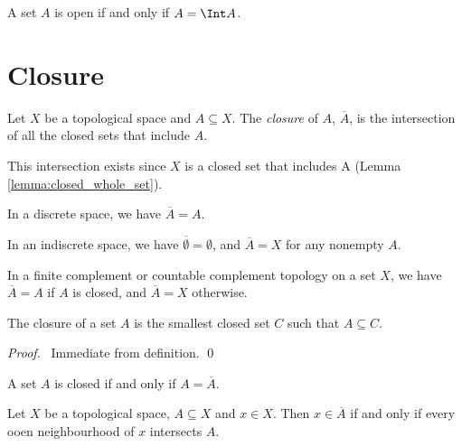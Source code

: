 \begin{corollary}
    \label{corollary:open_interior}
    A set $A$ is open if and only if $A = \Int A$.
\end{corollary}

\section{Closure}

\begin{definition}[Closure]
    Let $X$ be a topological space and $A \subseteq X$. The \emph{closure} of $A$, $\overline{A}$, is the
    intersection of all the closed sets that include $A$.
\end{definition}

This intersection exists since $X$ is a closed set that includes A (Lemma \ref{lemma:closed_whole_set}).

\begin{proposition}
    In a discrete space, we have $\overline{A} = A$.
\end{proposition}

\begin{proposition}
    In an indiscrete space, we have $\overline{\emptyset} = \emptyset$, and $\overline{A} = X$ for any nonempty $A$.
\end{proposition}

\begin{proposition}
    In a finite complement or countable complement topology on a set $X$, we have $\overline{A} = A$ if $A$ is closed,
    and $\overline{A} = X$ otherwise.
\end{proposition}

\begin{proposition}
    \label{proposition:closure_smallest}
    The closure of a set $A$ is the smallest closed set $C$ such that $A \subseteq C$.
\end{proposition}

\begin{proof}
    \pf\ Immediate from definition. \qed
\end{proof}

\begin{corollary}
    A set $A$ is closed if and only if $A = \overline{A}$.
\end{corollary}

\begin{proposition}
    \label{proposition:closure_neighbourhood}
    Let $X$ be a topological space, $A \subseteq X$ and $x \in X$. Then $x \in \overline{A}$ if and only if
    every ooen neighbourhood of $x$ intersects $A$.
\end{proposition}

